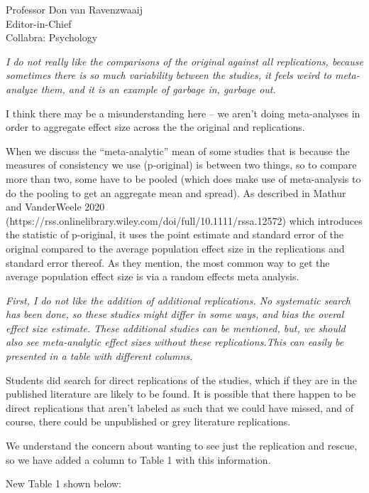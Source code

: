 \documentclass{stanfordletter}
\newcommand{\theysaid}[1]{\begin{leftbar} \noindent 
		\textsl{ #1}\end{leftbar}}
\begin{document}
\begin{letter}{Professor Don van Ravenzwaaij \\ Editor-in-Chief \\ Collabra: Psychology }
		\theysaid{I do not really like the comparisons of the original against all replications, because sometimes there is so much variability between the studies, it feels weird to meta-analyze them, and it is an example of garbage in, garbage out.}
		
		I think there may be a misunderstanding here -- we aren't doing meta-analyses in order to aggregate effect size across the the original and replications. 
		
		When we discuss the ``meta-analytic'' mean of some studies that is because the measures of consistency we use (p-original) is between two things, so to compare more than two, some have to be pooled (which does make use of meta-analysis to do the pooling to get an aggregate mean and spread). As described in Mathur and VanderWeele 2020 (https://rss.onlinelibrary.wiley.com/doi/full/10.1111/rssa.12572) which introduces the statistic of p-original, it uses the point estimate and standard error of the original compared to the average population effect size in the replications and standard error thereof. As they mention, the most common way to get the average population effect size is via a random effects meta analysis. 
		
		\theysaid{ First, I do not like the addition of additional replications. No systematic search has been done, so these studies might differ in some ways, and bias the overal effect size estimate. These additional studies can be mentioned, but, we should also see meta-analytic effect sizes without these replications.This can easily be presented in a table with different columns.}
		
		Students did search for direct replications of the studies, which if they are in the published literature are likely to be found. It is possible that there happen to be direct replications that aren't labeled as such that we could have missed, and of course, there could be unpublished or grey literature replications. 
		
		We understand the concern about wanting to see just the replication and rescue, so we have added a column to Table 1 with this information.
		
		New Table 1 shown below: 
		

\end{letter}
\end{document}
